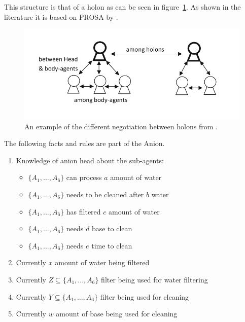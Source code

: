 This structure is that of a holon as can be seen in figure~\cref{fig:holonexample}. As shown in the literature it is based on PROSA by \citet{van1998reference}.
\begin{figure}
	\centering
	\includegraphics[width=0.7\linewidth]{img/holon_example}
	\caption{An example of the different negotiation between holons from \citet{beheshti2016negotiations}.}
	\label{fig:holonexample}
\end{figure}

The following facts and rules are part of the Anion.

\begin{enumerate}
	\item
	Knowledge of anion head about the sub-agents:
	\begin{itemize}
		\item {$\{A_1, ..., A_6\}$ can process $a$ amount of water}
		\item {$\{A_1, ..., A_6\}$ needs to be cleaned after $b$ water}
		\item {$\{A_1, ..., A_6\}$ has filtered $c$ amount of water}
		\item {$\{A_1, ..., A_6\}$ needs $d$ base to clean}
		\item {$\{A_1, ..., A_6\}$ needs $e$ time to clean}
	\end{itemize}
	\item
	Currently $x$ amount of water being filtered 
	\item
	Currently $Z \subseteq \{A_1, ..., A_6\}$ filter being used for water filtering
	\item
	Currently $Y \subseteq \{A_1, ..., A_6\}$ filter being used for cleaning
	\item
	Currently $w$ amount of base being used for cleaning
\end{enumerate}


